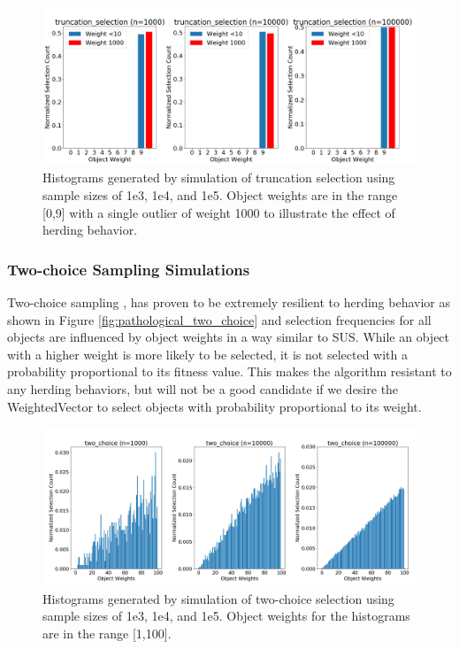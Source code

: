 \documentclass[12pt]{article}
\begin{document}
    \begin{figure}[h]
      \centering
      \includegraphics[scale=0.32]{images/pathological_truncation.png} 
      \caption{Histograms generated by simulation of truncation selection
               using sample sizes of 1e3, 1e4, and 1e5. Object weights are in
               the range [0,9] with a single outlier of weight 1000 to
               illustrate the effect of herding behavior.}
      \label{fig:pathological_truncation}
    \end{figure}

    \subsubsection{Two-choice Sampling Simulations}
    Two-choice sampling \cite{2choice}, has proven to be extremely resilient to
    herding behavior as shown in Figure \ref{fig:pathological_two_choice} and
    selection frequencies for all objects are influenced by object weights in a
    way similar to SUS. While an object with a higher weight is more likely to
    be selected, it is not selected with a probability proportional to its
    fitness value. This makes the algorithm resistant to any herding behaviors,
    but will not be a good candidate if we desire the WeightedVector to select
    objects with probability proportional to its weight.

    \begin{figure}[h]
      \centering
      \includegraphics[scale=0.32]{images/herding_two_choice.png} 
      \caption{Histograms generated by simulation of two-choice selection
               using sample sizes of 1e3, 1e4, and 1e5. Object weights
               for the histograms are in the range [1,100].}
      \label{fig:herding_two_choice}
    \end{figure}
\end{document}
